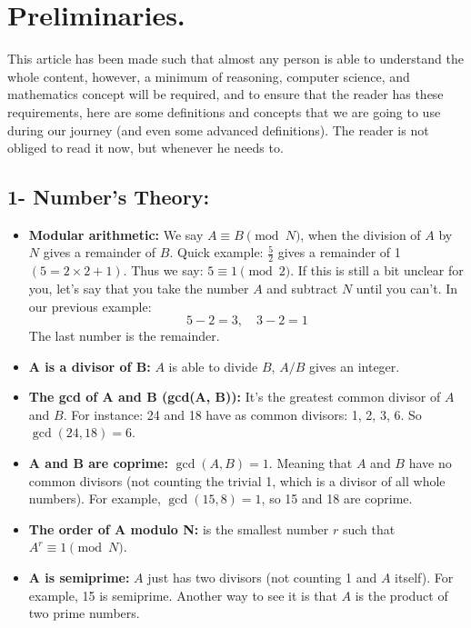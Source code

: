 \section{Preliminaries.}
This article has been made such that almost any person is able to understand the whole content, however, a minimum of reasoning, computer science, and mathematics concept will be required, and to ensure that the reader has these requirements, here are some definitions and concepts that we are going to use during our journey (and even some advanced definitions). The reader is not obliged to read it now, but whenever he needs to.
\subsection*{1- Number's Theory:}
\begin{itemize}
    \item \textbf{Modular arithmetic:} We say \( A \equiv B \pmod{N} \), when the division of \( A \) by \( N \) gives a remainder of \( B \). Quick example: \( \frac{5}{2} \) gives a remainder of 1 \((5 = 2 \times 2 + 1)\).
 Thus we say: \( 5 \equiv 1 \pmod{2} \). If this is still a bit unclear for you, let’s say that you take the number \( A \) and subtract \( N \) until you can’t. In our previous example:
    \[
    5 - 2 = 3, \quad 3 - 2 = 1
    \]
    The last number is the remainder.

    \item \textbf{A is a divisor of B:} \( A \) is able to divide \( B \), \( A/B \) gives an integer.

    \item \textbf{The gcd of A and B (gcd(A, B)):} It’s the greatest common divisor of \( A \) and \( B \). For instance: 24 and 18 have as common divisors: 1, 2, 3, 6. So \( \gcd(24, 18) = 6 \).

    \item \textbf{A and B are coprime:} \( \gcd(A, B) = 1 \). Meaning that \( A \) and \( B \) have no common divisors (not counting the trivial 1, which is a divisor of all whole numbers). For example, \( \gcd(15, 8) = 1 \), so 15 and 18 are coprime.

    \item \textbf{The order of A modulo N:} is the smallest number \( r \) such that \( A^r \equiv 1 \pmod{N} \).

    \item \textbf{A is semiprime:} \( A \) just has two divisors (not counting 1 and \( A \) itself). For example, 15 is semiprime. Another way to see it is that \( A \) is the product of two prime numbers.


\end{itemize}
